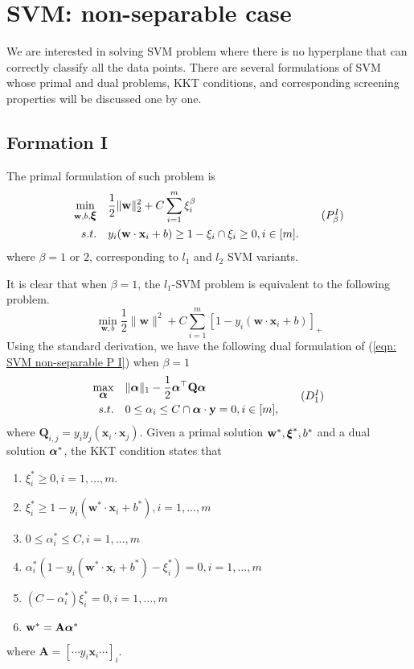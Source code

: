 \documentclass[
10pt, %
a4paper, %
oneside, %
headinclude,footinclude, %
BCOR5mm, %
]{scrartcl}
\newcommand{\AB}{\mathbf{A}}
\newcommand{\QB}{\mathbf{Q}}
\newcommand{\wB}{\mathbf{w}}
\newcommand{\xB}{\mathbf{x}}
\newcommand{\yB}{\mathbf{y}}
\newcommand{\xiB}{\mbox{\boldmath$\xi$\unboldmath}}
\newcommand{\alphaB}{\mbox{\boldmath$\alpha$\unboldmath}}
\begin{document}
\section{SVM: non-separable case}
We are interested in solving SVM problem where there is no hyperplane that can correctly classify all the data points.
There are several formulations of SVM whose primal and dual problems, KKT conditions, and corresponding screening properties will be discussed one by one.
\subsection{Formation I}
The primal formulation of such problem is 
\begin{equation}
	\begin{aligned}
		\min_{\wB, b, \xiB} & \quad \frac{1}{2}\|\wB\|_2^2+C\sum_{i=1}^{m}\xi_i^\beta  \\
		s.t. & \quad y_i(\wB\cdot\xB_i+b)\geq 1- \xi_i \cap \xi_i \geq 0, i\in[m].
	\end{aligned}
	\tag{$P^I_\beta$}
	\label{eqn: SVM non-separable P I}
\end{equation}
where $\beta = 1$ or $2$, corresponding to $l_1$ and $l_2$ SVM variants.

It is clear that when $\beta = 1$, the $l_1$-SVM problem is equivalent to the following problem.
\begin{equation}
	\min_{\wB, b} \frac{1}{2}\|\wB\|^2+C\sum_{i=1}^{m} [1-y_i(\wB\cdot\xB_i+b)]_+
\end{equation}
Using the standard derivation, we have the following dual formulation of (\ref{eqn: SVM non-separable P I}) when $\beta = 1$
\begin{equation*}
	\begin{aligned}
		\max_{\alphaB} & \quad \|\alphaB\|_1-\frac{1}{2}\alphaB^\top\QB\alphaB \\
		s.t. & \quad 0\leq \alpha_i \leq C \cap \alphaB\cdot\yB = 0, i\in [m],
	\end{aligned}
	\tag{$D^I_1$}
	\label{eqn: SVM non-separable D I}
\end{equation*}
where $\QB_{i,j} = y_iy_j(\xB_i\cdot\xB_j)$.
Given a primal solution $\wB^*, \xiB^*, b^*$ and a dual solution $\alphaB^*$, the KKT condition states that 
\begin{enumerate}
	\item $\xi^*_i \geq 0, i = 1, \ldots, m$.
	\item $\xi^*_i \geq 1 - y_i(\wB^*\cdot\xB_i+b^*), i = 1, \ldots, m$
	\item $0 \leq \alpha^*_i \leq C, i = 1, \ldots, m$
	\item $\alpha^*_i (1 - y_i(\wB^*\cdot\xB_i+b^*) - \xi^*_i) =0, i = 1, \ldots, m$
	\item $(C - \alpha^*_i) \xi^*_i = 0, i = 1, \ldots, m$
	\item $\wB^* = \AB \alphaB^*$
\end{enumerate}
where $\AB = [\cdots y_i\xB_i \cdots]_i$.
\end{document}
